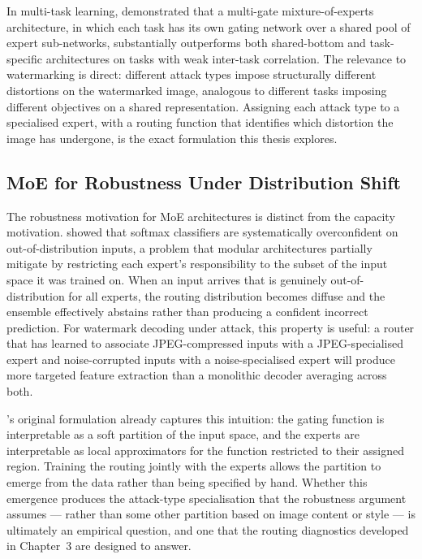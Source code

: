 ﻿\documentclass[12pt, a4paper, twoside]{report}
\numberwithin{equation}{chapter}
\begin{document}
In multi-task learning, \cite{ma2018} demonstrated that a multi-gate mixture-of-experts architecture, in which each task has its own gating network over a shared pool of expert sub-networks, substantially outperforms both shared-bottom and task-specific architectures on tasks with weak inter-task correlation. The relevance to watermarking is direct: different attack types impose structurally different distortions on the watermarked image, analogous to different tasks imposing different objectives on a shared representation. Assigning each attack type to a specialised expert, with a routing function that identifies which distortion the image has undergone, is the exact formulation this thesis explores.

\subsection*{MoE for Robustness Under Distribution Shift}

The robustness motivation for MoE architectures is distinct from the capacity motivation. \cite{guo2018} showed that softmax classifiers are systematically overconfident on out-of-distribution inputs, a problem that modular architectures partially mitigate by restricting each expert's responsibility to the subset of the input space it was trained on. When an input arrives that is genuinely out-of-distribution for all experts, the routing distribution becomes diffuse and the ensemble effectively abstains rather than producing a confident incorrect prediction. For watermark decoding under attack, this property is useful: a router that has learned to associate JPEG-compressed inputs with a JPEG-specialised expert and noise-corrupted inputs with a noise-specialised expert will produce more targeted feature extraction than a monolithic decoder averaging across both.

\cite{jacobs1991}'s original formulation already captures this intuition: the gating function is interpretable as a soft partition of the input space, and the experts are interpretable as local approximators for the function restricted to their assigned region. Training the routing jointly with the experts allows the partition to emerge from the data rather than being specified by hand. Whether this emergence produces the attack-type specialisation that the robustness argument assumes --- rather than some other partition based on image content or style --- is ultimately an empirical question, and one that the routing diagnostics developed in Chapter~3 are designed to answer.
\end{document}
